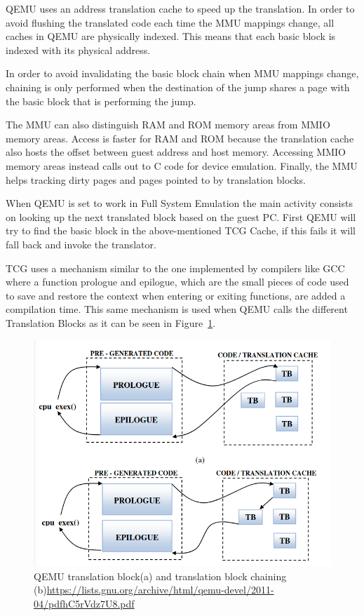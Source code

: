 \begin{itemize}
    QEMU uses an address translation cache to speed up the translation. In order to avoid flushing the translated code each time the MMU mappings change, all caches in QEMU are physically indexed. This means that each basic block is indexed with its physical address.

    In order to avoid invalidating the basic block chain when MMU mappings change, chaining is only performed when the destination of the jump shares a page with the basic block that is performing the jump.

    The MMU can also distinguish RAM and ROM memory areas from MMIO memory areas. Access is faster for RAM and ROM because the translation cache also hosts the offset between guest address and host memory. Accessing MMIO memory areas instead calls out to C code for device emulation. Finally, the MMU helps tracking dirty pages and pages pointed to by translation blocks.

\end{itemize}

When QEMU is set to work in Full System Emulation the main activity consists on looking up the next translated block based on the guest PC. First QEMU will try to find the basic block in the above-mentioned TCG Cache, if this fails it will fall back and invoke the translator. 

TCG uses a mechanism similar to the one implemented by compilers like GCC where a function prologue and epilogue, which are the small pieces of code used to save and restore the context when entering or exiting functions, are added a compilation time. This same mechanism is used when QEMU calls the different Translation Blocks as it can be seen in Figure~\ref{fig:qemutbc}.  

\begin{figure}[htp]
\centering
\includegraphics[width=\linewidth]{images/qemutbc.png}
\caption{QEMU translation block(a) and translation block chaining (b)\newline\url{https://lists.gnu.org/archive/html/qemu-devel/2011-04/pdfhC5rVdz7U8.pdf}}
\label{fig:qemutbc}
\end{figure}

